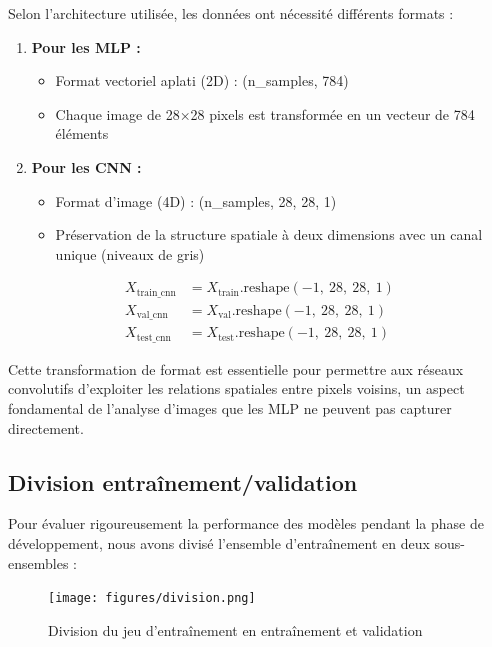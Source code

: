 Selon l'architecture utilisée, les données ont nécessité différents formats :

\begin{enumerate}
\item \textbf{Pour les MLP :}
\begin{itemize}
\item Format vectoriel aplati (2D) : (n\_samples, 784)
\item Chaque image de 28×28 pixels est transformée en un vecteur de 784 éléments
\end{itemize}
\item \textbf{Pour les CNN :}
\begin{itemize}
\item Format d'image (4D) : (n\_samples, 28, 28, 1)
\item Préservation de la structure spatiale à deux dimensions avec un canal unique (niveaux de gris)
\end{itemize}
\end{enumerate}
\[
\begin{aligned}
X_{\text{train\_cnn}} &= X_{\text{train}}.\text{reshape}(-1,\ 28,\ 28,\ 1) \\
X_{\text{val\_cnn}}   &= X_{\text{val}}.\text{reshape}(-1,\ 28,\ 28,\ 1) \\
X_{\text{test\_cnn}}  &= X_{\text{test}}.\text{reshape}(-1,\ 28,\ 28,\ 1)
\end{aligned}
\]


Cette transformation de format est essentielle pour permettre aux réseaux convolutifs d'exploiter les relations spatiales entre pixels voisins, un aspect fondamental de l'analyse d'images que les MLP ne peuvent pas capturer directement.

\subsection{Division entraînement/validation}

\begin{flushleft}
Pour évaluer rigoureusement la performance des modèles pendant la phase de développement, nous avons divisé l'ensemble d'entraînement en deux sous-ensembles :
\end{flushleft}

\begin{figure}[h]
\centering
\texttt{[image: figures/division.png]}
\caption{Division du jeu d'entraînement en entraînement et validation}
\label{fig:urdu_division}
\end{figure}

